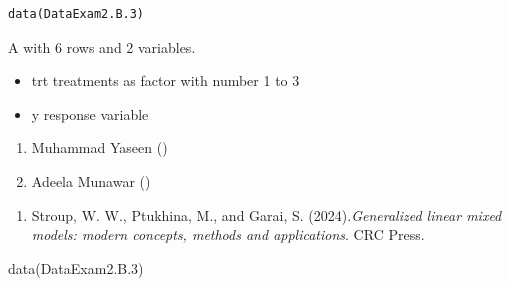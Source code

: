 \documentclass[a4paper]{book}
\begin{document}
%
\begin{Usage}
\begin{verbatim}
data(DataExam2.B.3)
\end{verbatim}
\end{Usage}
%
\begin{Format}
A  with 6 rows and 2 variables.
\end{Format}
%
\begin{Details}
\begin{itemize}

\item{} trt treatments as factor with number 1 to 3
\item{} y   response variable

\end{itemize}

\end{Details}
%
\begin{Author}
\begin{enumerate}

\item{}  Muhammad Yaseen ()
\item{} Adeela Munawar ()

\end{enumerate}

\end{Author}
%
\begin{References}
\begin{enumerate}

\item{} Stroup, W. W., Ptukhina, M., and Garai, S. (2024).\emph{Generalized linear mixed models: modern concepts, methods and applications}.
CRC Press.

\end{enumerate}

\end{References}
%
\begin{SeeAlso}
\end{SeeAlso}
%
\begin{Examples}
\begin{ExampleCode}
data(DataExam2.B.3)
\end{ExampleCode}
\end{Examples}
\end{document}
